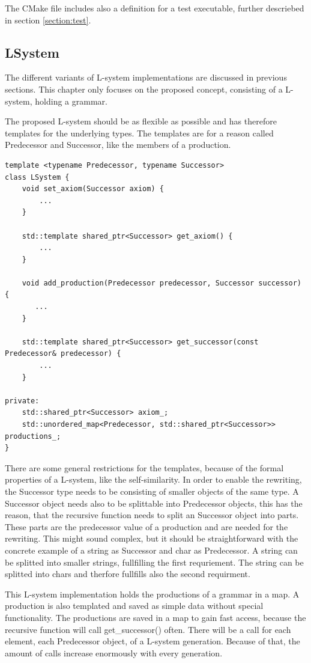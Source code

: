 \documentclass[english]{cpp-hmwk}
\begin{document}
The CMake file includes also a definition for a test executable, further descriebed in section \ref{section:test}.

\subsection{LSystem}
\label{section:impl_l_system}
The different variants of L-system implementations are discussed in previous sections. This chapter only focuses on the proposed concept, consisting of a L-system, holding a grammar.

The proposed L-system should be as flexible as possible and has therefore templates for the underlying types. The templates are for a reason called Predecessor and Successor, like the members of a production.

\medskip
\begin{lstlisting}
template <typename Predecessor, typename Successor>
class LSystem {
    void set_axiom(Successor axiom) {
        ...
    }

    std::template shared_ptr<Successor> get_axiom() {
        ...
    }

    void add_production(Predecessor predecessor, Successor successor) {
       ...
    }

    std::template shared_ptr<Successor> get_successor(const Predecessor& predecessor) {
        ...
    }
    
private:
    std::shared_ptr<Successor> axiom_;
    std::unordered_map<Predecessor, std::shared_ptr<Successor>> productions_;
}
\end{lstlisting}

\noindent There are some general restrictions for the templates, because of the formal properties of a L-system, like the self-similarity. In order to enable the rewriting, the Successor type needs to be consisting of smaller objects of the same type. A Successor object needs also to be splittable into Predecessor objects, this has the reason, that the recursive function needs to split an Successor object into parts. These parts are the predecessor value of a production and are needed for the rewriting.
This might sound complex, but  it should be straightforward with the concrete example of a string as Successor and char as Predecessor. A string can be splitted into smaller strings, fullfilling the first requriement. The string can be splitted into chars and therfore fullfills also the second requirment.

This L-system implementation holds the productions of a grammar in a map. A production is also templated and saved as simple data without special functionality. The productions are saved in a map to gain fast access, because the recursive function will call get\_successor() often. There will be a call for each element, each Predecessor object, of a L-system generation. Because of that, the amount of calls increase enormously with every generation.
\end{document}
